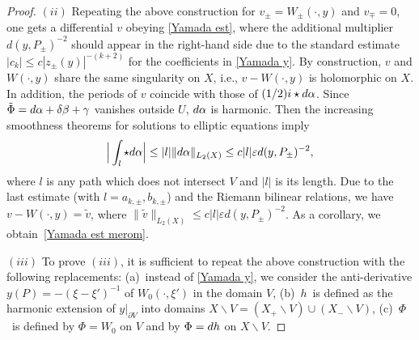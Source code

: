 \documentclass[10pt,a4paper]{amsart}
\begin{document}
\begin{proof}
$(ii)$ Repeating the above construction for $v_\pm=W_\pm(\cdot,y)$ and $v_\mp=0$, one gets a differential $v$ obeying \eqref{Yamada est}, where the additional multiplier $ d(y,P_\pm)^{-2}$ should appear in the right-hand side due to the standard estimate $|c_k|\le c|z_\pm(y)|^{-(k+2)}$ for the coefficients in \eqref{Yamada y}. By construction, $v$ and $W(\cdot,y)$ share the same singularity on $X$, i.e., $v-W(\cdot,y)$ is holomorphic on $X$. In addition, the periods of $v$ coincide with those of $(1/2){\rm i}\star {\rm d}\alpha$. Since $\tilde{\Phi}={\rm d}\alpha+\delta\beta+\gamma$ vanishes outside $U$, ${\rm d}\alpha$ is harmonic. Then the increasing smoothness theorems for solutions to elliptic equations imply
\[\Big|\int_l\star {\rm d}\alpha\Big|\le |l|\|{\rm d}\alpha\|_{L_2(X)}\le c|l|\varepsilon d(y,P_\pm)^{-2},\]
where $l$ is any path which does not intersect $V$ and $|l|$ is its length. Due to the last estimate (with $l=a_{k,\pm},b_{k,\pm}$) and the Riemann bilinear relations, we have $v-W(\cdot,y)=\tilde{v}$, where $\|\tilde{v}\|_{L_2(X)}\le c|l|\varepsilon d(y,P_\pm)^{-2}$. As a corollary, we obtain~\eqref{Yamada est merom}.

$(iii)$ To prove $(iii)$, it is sufficient to repeat the above construction with the following replacements: (a)~instead of \eqref{Yamada y}, we consider the anti-derivative $y(P)=-(\xi-\xi')^{-1}$ of $W_0(\cdot,\xi')$ in the domain $V$, (b)~$h$~is defined as the harmonic extension of $y|_{\partial V}$ into domains $X\backslash V=(X_+\backslash V)\cup (X_-\backslash V)$, (c)~$\Phi$~is defined by $\Phi=W_0$ on $V$ and by $\Phi={\rm d}h$ on $X\backslash V$.
\end{proof}
\end{document}
